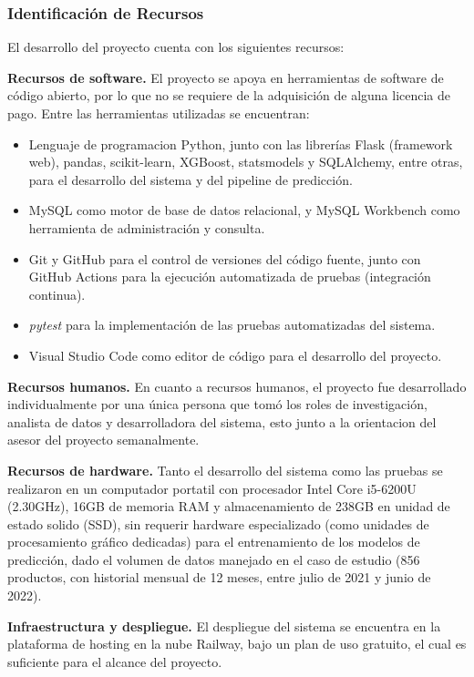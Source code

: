 \subsubsection{Identificación de Recursos}
El desarrollo del proyecto cuenta con los siguientes recursos:

\textbf{Recursos de software.} El proyecto se apoya en herramientas de software de código abierto, por lo que no se requiere de la adquisición de alguna licencia de pago. Entre las herramientas utilizadas se encuentran:

\begin{itemize}
    \item Lenguaje de programacion Python, junto con las librerías Flask (framework web), pandas, scikit-learn, XGBoost, statsmodels y SQLAlchemy, entre otras, para el desarrollo del sistema y del pipeline de predicción.
    \item MySQL como motor de base de datos relacional, y MySQL Workbench como herramienta de administración y consulta.
    \item Git y GitHub para el control de versiones del código fuente, junto con GitHub Actions para la ejecución automatizada de pruebas (integración continua).
    \item \textit{pytest} para la implementación de las pruebas automatizadas del sistema.
    \item Visual Studio Code como editor de código para el desarrollo del proyecto.
\end{itemize}


\textbf{Recursos humanos.} En cuanto a recursos humanos, el proyecto fue desarrollado individualmente por una única persona que tomó los roles de investigación, analista de datos y desarrolladora del sistema, esto junto a la orientacion del asesor del proyecto semanalmente.


\textbf{Recursos de hardware.} Tanto el desarrollo del sistema como las pruebas se realizaron en un computador portatil con procesador Intel Core i5-6200U (2.30GHz), 16GB de memoria RAM y almacenamiento de 238GB en unidad de estado solido (SSD), sin requerir hardware especializado (como unidades de procesamiento gráfico dedicadas) para el entrenamiento de los modelos de predicción, dado el volumen de datos manejado en el caso de estudio (856 productos, con historial mensual de 12 meses, entre julio de 2021 y junio de 2022).


\textbf{Infraestructura y despliegue.} El despliegue del sistema se encuentra en la plataforma de hosting en la nube Railway, bajo un plan de uso gratuito, el cual es suficiente para el alcance del proyecto.



